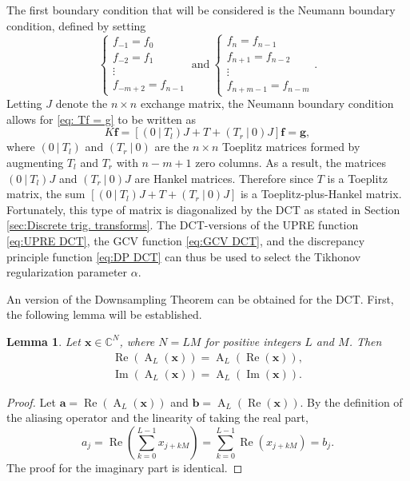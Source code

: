 \documentclass[12pt,notitlepage]{report}
\newcommand{\gVec}{\mathbf{g}}	%
\newcommand{\fVec}{\mathbf{f}}	%
\DeclareMathOperator{\alias}{A}	%
\newcommand{\regparam}{\alpha}
\renewcommand{\Re}{\operatorname{Re}}	%
\renewcommand{\Im}{\operatorname{Im}}	%
\newtheorem{lemma}{Lemma}[section]
\begin{document}
The first boundary condition that will be considered is the Neumann boundary condition, defined by setting
\[\begin{cases}
f_{-1} = f_0 \\
f_{-2} = f_1 \\
\vdots \\
f_{-m+2} = f_{n-1}
\end{cases} ~ \text{and} ~
\begin{cases}
f_{n} = f_{n-1} \\
f_{n+1} = f_{n-2} \\
\vdots \\
f_{n+m-1} = f_{n-m}
\end{cases}.\]
Letting $J$ denote the $n \times n$ exchange matrix, the Neumann boundary condition allows for \eqref{eq: Tf = g} to be written as
\begin{equation}
\label{eq:Neumann Kf = g}
K\fVec = [(0~|~T_{l})J + T + (T_{r}~|~0)J]\fVec = \gVec,
\end{equation}
where $(0~|~T_{l})$ and $(T_{r}~|~0)$ are the $n \times n$ Toeplitz matrices formed by augmenting $T_{l}$ and $T_{r}$ with $n-m+1$ zero columns. As a result, the matrices $(0~|~T_{l})J$ and $(T_{r}~|~0)J$ are Hankel matrices. Therefore since $T$ is a Toeplitz matrix, the sum $[(0~|~T_{l})J + T + (T_{r}~|~0)J]$ is a Toeplitz-plus-Hankel matrix. Fortunately, this type of matrix is diagonalized by the DCT as stated in Section \ref{sec:Discrete trig. transforms}. The DCT-versions of the UPRE function \eqref{eq:UPRE DCT}, the GCV function \eqref{eq:GCV DCT}, and the discrepancy principle function \eqref{eq:DP DCT} can thus be used to select the Tikhonov regularization parameter $\regparam$. \par 
An version of the Downsampling Theorem can be obtained for the DCT. First, the following lemma will be established.
\begin{lemma}
Let $\mathbf{x} \in \mathbb{C}^N$, where $N = LM$ for positive integers $L$ and $M$. Then
\begin{align*}
\Re\left(\alias_L(\mathbf{x})\right) = \alias_L\left(\Re(\mathbf{x})\right), \\
\Im\left(\alias_L(\mathbf{x})\right) = \alias_L\left(\Im(\mathbf{x})\right).
\end{align*}
\end{lemma}
\begin{proof}
Let $\mathbf{a} = \Re(\alias_L(\mathbf{x}))$ and $\mathbf{b} = \alias_L(\Re(\mathbf{x}))$. By the definition of the aliasing operator and the linearity of taking the real part,
\[a_j = \Re\left(\sum_{k=0}^{L-1} x_{j+kM}\right) = \sum_{k=0}^{L-1} \Re(x_{j+kM}) = b_j.\]
The proof for the imaginary part is identical.
\end{proof}
\end{document}
